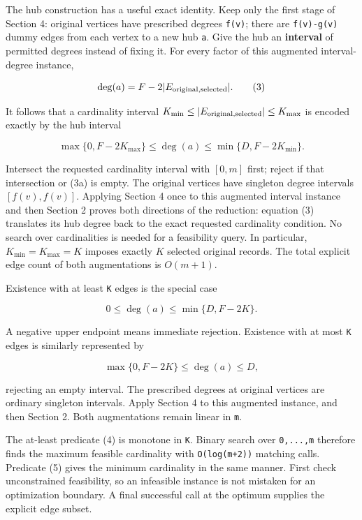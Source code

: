 The hub construction has a useful exact identity. Keep only the first stage of Section 4: original vertices have prescribed degrees \texttt{f(v)}; there are \texttt{f(v)-g(v)} dummy edges from each vertex to a new hub \texttt{a}. Give the hub an \textbf{interval} of permitted degrees instead of fixing it. For every factor of this augmented interval-degree instance,

\[
\deg(a)=F-2|E_{\rm original,selected}|.                \tag{3}
\]

It follows that a cardinality interval \(K_{\min}\leq |E_{\rm original,selected}|\leq K_{\max}\) is encoded exactly by the hub interval

\[
\max\{0,F-2K_{\max}\}\leq\deg(a)
        \leq\min\{D,F-2K_{\min}\}.
\tag{3a}
\]

Intersect the requested cardinality interval with \([0,m]\) first; reject if that intersection or (3a) is empty. The original vertices have singleton degree intervals \([f(v),f(v)]\). Applying Section 4 once to this augmented interval instance and then Section 2 proves both directions of the reduction: equation (3) translates its hub degree back to the exact requested cardinality condition. No search over cardinalities is needed for a feasibility query. In particular, \(K_{\min}=K_{\max}=K\) imposes exactly \(K\) selected original records. The total explicit edge count of both augmentations is \(O(m+1)\).

Existence with at least \texttt{K} edges is the special case

\[
0\leq\deg(a)\leq\min\{D,F-2K\}.                     \tag{4}
\]

A negative upper endpoint means immediate rejection. Existence with at most \texttt{K} edges is similarly represented by

\[
\max\{0,F-2K\}\leq\deg(a)\leq D,                     \tag{5}
\]

rejecting an empty interval. The prescribed degrees at original vertices are ordinary singleton intervals. Apply Section 4 to this augmented instance, and then Section 2. Both augmentations remain linear in \texttt{m}.

The at-least predicate (4) is monotone in \texttt{K}. Binary search over \texttt{0,...,m} therefore finds the maximum feasible cardinality with \texttt{O(log(m+2))} matching calls. Predicate (5) gives the minimum cardinality in the same manner. First check unconstrained feasibility, so an infeasible instance is not mistaken for an optimization boundary. A final successful call at the optimum supplies the explicit edge subset.

